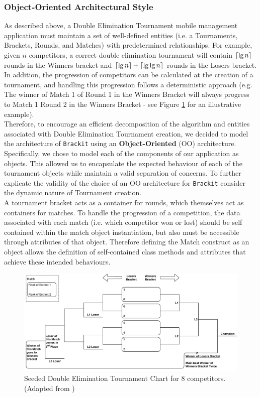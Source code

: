 \documentclass{article}
\DeclarePairedDelimiter{\ceil}{\lceil}{\rceil}
\begin{document}
\subsubsection{Object-Oriented Architectural Style}
\label{sssec:ooas}
As described above, a Double Elimination Tournament mobile management application must maintain a set of well-defined entities (i.e. a Tournaments, Brackets, Rounds, and Matches) with predetermined relationships. For example, given $n$ competitors, a correct double elimination tournament will contain $\ceil{\lg n}$ rounds in the Winners bracket and $\ceil{\lg n} + 
\ceil{\lg \lg n}$ rounds in the Losers bracket. In addition, the progression of competitors can be calculated at the creation of a tournament, and handling this progression follows a deterministic approach (e.g. The winner of Match 1 of Round 1 in the Winners Bracket will always progress to Match 1 Round 2 in the Winners Bracket - see Figure \ref{fig:deb} for an illustrative example).\\
Therefore, to encourage an efficient decomposition of the algorithm and entities associated with Double Elimination Tournament creation, we decided to model the architecture of \texttt{Brackit} using an \textbf{Object-Oriented} (OO) architecture. 
Specifically, we chose to model each of the components of our application as objects. This allowed us to encapsulate the expected behaviour of each of the tournament objects while maintain a valid separation of concerns. To further explicate the validity of the choice of an OO architecture for \texttt{Brackit} consider the dynamic nature of Tournament creation.\\
A tournament bracket acts as a container for rounds, which themselves act as containers for matches.
To handle the progression of a competition, the data associated with each match (i.e. which competitor won or lost) should be self contained within the match object instantiation, but also must be accessible through attributes of that object. Therefore defining the Match construct as an object allows the definition of self-contained class methods and attributes that achieve these intended behaviours.
    \begin{figure}[htp]
        \centering
        \includegraphics[width=12cm]{../diagrams/double_elim_bracket_comp.pdf}
        \caption{Seeded Double Elimination Tournament Chart for 8 competitors. (Adapted from \cite{se:tba})}
        \label{fig:deb}
        \end{figure}
\end{document}

